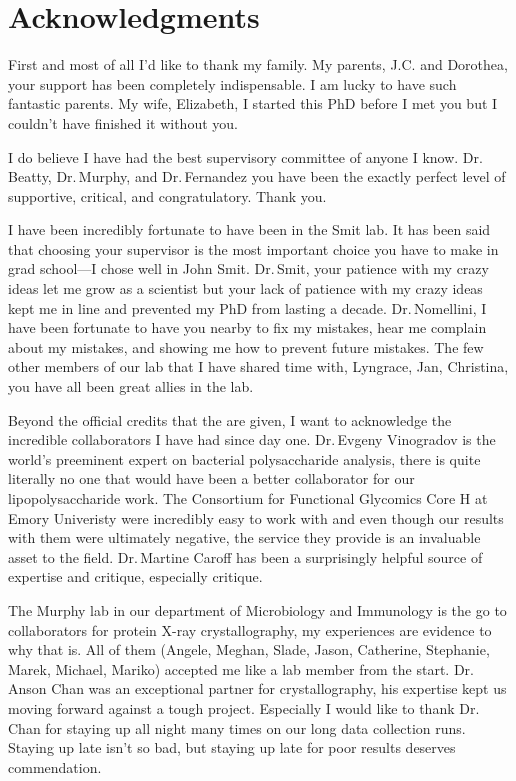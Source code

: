 
\chapter{Acknowledgments}

First and most of all I'd like to thank my family. My parents, J.C. and Dorothea, your support has been completely indispensable. I am lucky to have such fantastic parents. My wife, Elizabeth, I started this PhD before I met you but I couldn't have finished it without you. 

I do believe I have had the best supervisory committee of anyone I know. Dr.\,Beatty, Dr.\,Murphy, and  Dr.\,Fernandez you have been the exactly perfect level of supportive, critical, and congratulatory. Thank you.

I have been incredibly fortunate to have been in the Smit lab. It has been said that choosing your supervisor is the most important choice you have to make in grad school---I chose well in John Smit. Dr.\,Smit, your patience with my crazy ideas let me grow as a scientist but your lack of patience with my crazy ideas kept me in line and prevented my PhD from lasting a decade. Dr.\,Nomellini, I have been fortunate to have you nearby to fix my mistakes, hear me complain about my mistakes, and showing me how to prevent future mistakes. The few other members of our lab that I have shared time with, Lyngrace, Jan, Christina, you have all been great allies in the lab.

Beyond the official credits that the are given, I want to acknowledge the incredible collaborators I have had since day one. 
Dr.\,Evgeny Vinogradov is the world's preeminent expert on bacterial polysaccharide analysis, there is quite literally no one that would have been a better collaborator for our lipopolysaccharide work. The Consortium for Functional Glycomics Core H at Emory Univeristy were incredibly easy to work with and even though our results with them were ultimately negative, the service they provide is an invaluable asset to the field. Dr.\,Martine Caroff has been a surprisingly helpful source of expertise and critique, especially critique.

The Murphy lab in our department of Microbiology and Immunology is the go to collaborators for protein X-ray crystallography, my experiences are evidence to why that is. All of them (Angele, Meghan, Slade, Jason, Catherine, Stephanie, Marek, Michael, Mariko) accepted me like a lab member from the start. Dr.\,Anson Chan was an exceptional partner for crystallography, his expertise kept us moving forward against a tough project. Especially I would like to thank Dr.\,Chan for staying up all night many times on our long data collection runs. Staying up late isn't so bad, but staying up late for poor results deserves commendation. 

